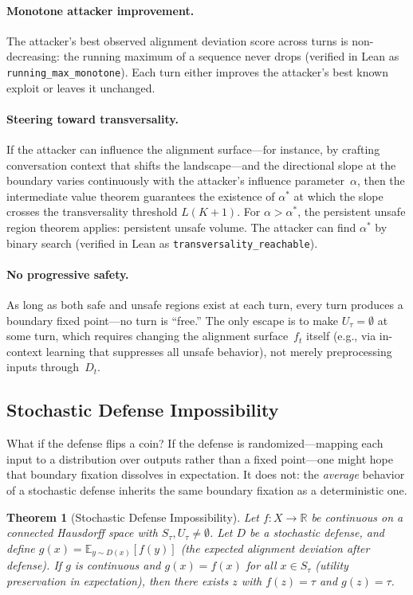 \documentclass[11pt]{article}
\newtheorem{theorem}{Theorem}[section]
\newcommand{\R}{\mathbb{R}}
\begin{document}
\paragraph{Monotone attacker improvement.}
The attacker's best observed alignment deviation score across turns is
non-decreasing: the running maximum of a sequence never drops
(verified in Lean as \texttt{running\_max\_monotone}). Each turn either
improves the attacker's best known exploit or leaves it unchanged.

\paragraph{Steering toward transversality.}
If the attacker can influence the alignment surface---for instance, by
crafting conversation context that shifts the landscape---and the
directional slope at the boundary varies continuously with the
attacker's influence parameter~$\alpha$, then the intermediate value
theorem guarantees the existence of $\alpha^*$ at which the slope
crosses the transversality threshold $L(K+1)$. For $\alpha > \alpha^*$,
the persistent unsafe region theorem applies: persistent unsafe volume.
The attacker can find $\alpha^*$ by binary search (verified in Lean as
\texttt{transversality\_reachable}).

\paragraph{No progressive safety.}
As long as both safe and unsafe regions exist at each turn, every turn
produces a boundary fixed point---no turn is ``free.'' The only escape
is to make $U_\tau = \emptyset$ at some turn, which requires changing
the alignment surface~$f_t$ itself (e.g., via in-context learning that
suppresses all unsafe behavior), not merely preprocessing inputs
through~$D_t$.

\subsection{Stochastic Defense Impossibility}

What if the defense flips a coin? If the defense is randomized---mapping
each input to a distribution over outputs rather than a fixed
point---one might hope that boundary fixation dissolves in expectation.
It does not: the \emph{average} behavior of a stochastic defense
inherits the same boundary fixation as a deterministic one.

\begin{theorem}[Stochastic Defense Impossibility]
\label{thm:stochastic}
Let $f\colon X \to \R$ be continuous on a connected Hausdorff space
with $S_\tau, U_\tau \neq \emptyset$. Let $D$ be a stochastic defense,
and define $g(x) = \mathbb{E}_{y \sim D(x)}[f(y)]$ (the expected
alignment deviation after defense). If $g$ is continuous and $g(x) =
f(x)$ for all $x \in S_\tau$ (utility preservation in expectation),
then there exists $z$ with $f(z) = \tau$ and $g(z) = \tau$.
\end{theorem}
\end{document}
